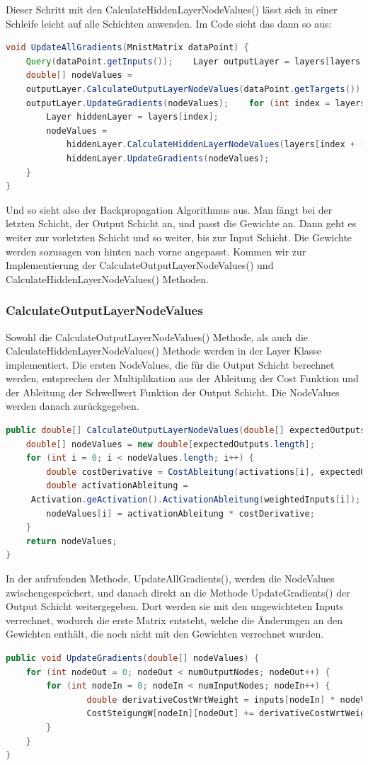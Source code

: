 \documentclass[12pt]{article}
\begin{document}
Dieser Schritt mit den CalculateHiddenLayerNodeValues() lässt sich in einer Schleife leicht auf alle Schichten anwenden. Im Code sieht das dann so aus:\begin{lstlisting}[language=Java]
void UpdateAllGradients(MnistMatrix dataPoint) {
    Query(dataPoint.getInputs());    Layer outputLayer = layers[layers.length - 1];
    double[] nodeValues = 
    outputLayer.CalculateOutputLayerNodeValues(dataPoint.getTargets());
    outputLayer.UpdateGradients(nodeValues);    for (int index = layers.length - 2; index >= 0; index--) {
        Layer hiddenLayer = layers[index];
        nodeValues = 
            hiddenLayer.CalculateHiddenLayerNodeValues(layers[index + 1], nodeValues);
            hiddenLayer.UpdateGradients(nodeValues);
    }
}
\end{lstlisting}
Und so sieht also der Backpropagation Algorithmus aus. Man fängt bei der letzten Schicht, der Output Schicht an, und passt die Gewichte an. Dann geht es weiter zur vorletzten Schicht und so weiter, bis zur Input Schicht. Die Gewichte werden sozusagen von hinten nach vorne angepasst.
Kommen wir zur Implementierung der CalculateOutputLayerNodeValues() und CalculateHiddenLayerNodeValues() Methoden.\subsubsection{CalculateOutputLayerNodeValues}Sowohl die CalculateOutputLayerNodeValues() Methode, als auch die CalculateHiddenLayerNodeValues() Methode werden in der Layer Klasse implementiert.
Die ersten NodeValues, die für die Output Schicht berechnet werden, entsprechen der Multiplikation aus der Ableitung der Cost Funktion und der Ableitung der Schwellwert Funktion der Output Schicht.
Die NodeValues werden danach zurückgegeben.\begin{lstlisting}[language=Java]
public double[] CalculateOutputLayerNodeValues(double[] expectedOutputs) {
    double[] nodeValues = new double[expectedOutputs.length];
    for (int i = 0; i < nodeValues.length; i++) {
        double costDerivative = CostAbleitung(activations[i], expectedOutputs[i]);
        double activationAbleitung = 
     Activation.geActivation().ActivationAbleitung(weightedInputs[i]);
        nodeValues[i] = activationAbleitung * costDerivative;
    }
    return nodeValues;
}
\end{lstlisting}
In der aufrufenden Methode, UpdateAllGradients(), werden die NodeValues zwischengespeichert, und danach direkt an die Methode UpdateGradients() der Output Schicht weitergegeben. Dort werden sie mit den ungewichteten Inputs verrechnet, wodurch die erste Matrix entsteht, welche die Änderungen an den Gewichten enthält, die noch nicht mit den Gewichten verrechnet wurden.\begin{lstlisting}[language=Java]
public void UpdateGradients(double[] nodeValues) {
    for (int nodeOut = 0; nodeOut < numOutputNodes; nodeOut++) {
        for (int nodeIn = 0; nodeIn < numInputNodes; nodeIn++) {
	            double derivativeCostWrtWeight = inputs[nodeIn] * nodeValues[nodeOut];
	            CostSteigungW[nodeIn][nodeOut] += derivativeCostWrtWeight;
        }
    }
}
\end{lstlisting}
\end{document}
